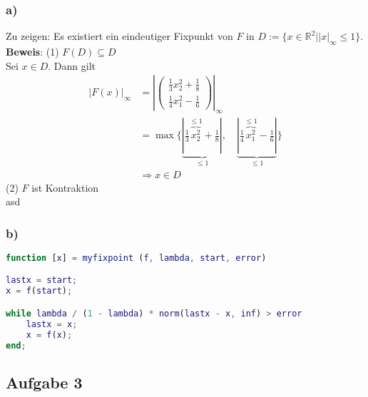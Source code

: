 \documentclass[11pt,a4paper,ngerman]{article}
\begin{document}
\subsubsection*{a)}
Zu zeigen: Es existiert ein eindeutiger Fixpunkt von $F$ in 
$D := \{x\in \mathbb{R}^2 | \left|x\right|_\infty \leq 1 \}$. \\

\textbf{Beweis}: (1) $F(D) \subseteq D$ \\
Sei $x \in D$. Dann gilt
\begin{equation*}\begin{split}
\left|F(x)\right|_\infty &=  \left|\left(\begin{array}{c}
\frac{1}{3}x_2^2+\frac{1}{8}\\
\frac{1}{4}x_1^2-\frac{1}{6}\end{array} \right)\right|_\infty \\
     &= \max \{ \underbrace{|\frac{1}{3}\overbrace{x_2^2}^{\leq 1}+\frac{1}{8}|}_{\leq 1}, \quad 
                \underbrace{|\frac{1}{4}\overbrace{x_1^2}^{\leq 1}-\frac{1}{6} |}_{\leq 1} \} \\
     &\Rightarrow x \in D
\end{split}\end{equation*}
(2) $F$ ist Kontraktion\\
asd
\subsubsection*{b)}
\begin{lstlisting}[language=matlab]
function [x] = myfixpoint (f, lambda, start, error)

lastx = start;
x = f(start);

while lambda / (1 - lambda) * norm(lastx - x, inf) > error
    lastx = x;
    x = f(x);
end;
\end{lstlisting}
\subsection*{Aufgabe 3}

\label{LastPage}
\end{document}
